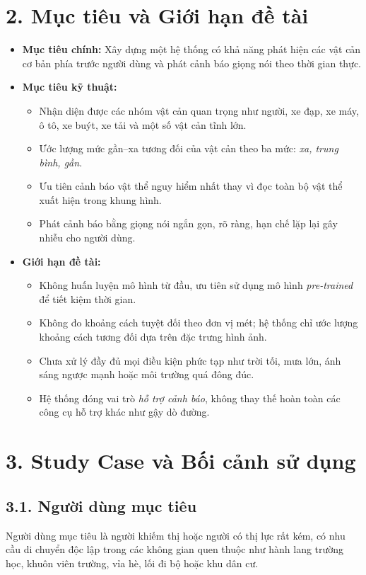 \documentclass[11pt, a4paper]{article}
\begin{document}
\section*{2. Mục tiêu và Giới hạn đề tài}
\begin{itemize}
    \item \textbf{Mục tiêu chính:} Xây dựng một hệ thống có khả năng phát hiện các vật cản cơ bản phía trước người dùng và phát cảnh báo giọng nói theo thời gian thực.
    \item \textbf{Mục tiêu kỹ thuật:}
    \begin{itemize}
        \item Nhận diện được các nhóm vật cản quan trọng như người, xe đạp, xe máy, ô tô, xe buýt, xe tải và một số vật cản tĩnh lớn.
        \item Ước lượng mức gần--xa tương đối của vật cản theo ba mức: \textit{xa, trung bình, gần}.
        \item Ưu tiên cảnh báo vật thể nguy hiểm nhất thay vì đọc toàn bộ vật thể xuất hiện trong khung hình.
        \item Phát cảnh báo bằng giọng nói ngắn gọn, rõ ràng, hạn chế lặp lại gây nhiễu cho người dùng.
    \end{itemize}
    \item \textbf{Giới hạn đề tài:}
    \begin{itemize}
        \item Không huấn luyện mô hình từ đầu, ưu tiên sử dụng mô hình \textit{pre-trained} để tiết kiệm thời gian.
        \item Không đo khoảng cách tuyệt đối theo đơn vị mét; hệ thống chỉ ước lượng khoảng cách tương đối dựa trên đặc trưng hình ảnh.
        \item Chưa xử lý đầy đủ mọi điều kiện phức tạp như trời tối, mưa lớn, ánh sáng ngược mạnh hoặc môi trường quá đông đúc.
        \item Hệ thống đóng vai trò \textit{hỗ trợ cảnh báo}, không thay thế hoàn toàn các công cụ hỗ trợ khác như gậy dò đường.
    \end{itemize}
\end{itemize}

\section*{3. Study Case và Bối cảnh sử dụng}
\subsection*{3.1. Người dùng mục tiêu}
Người dùng mục tiêu là người khiếm thị hoặc người có thị lực rất kém, có nhu cầu di chuyển độc lập trong các không gian quen thuộc như hành lang trường học, khuôn viên trường, vỉa hè, lối đi bộ hoặc khu dân cư.
\end{document}

